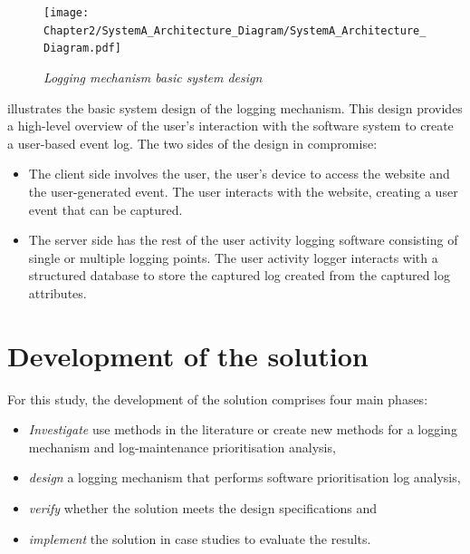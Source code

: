  \clearpage

 \begin{figure}[!htb]
	 \centering %
	 \texttt{[image: Chapter2/SystemA\_Architecture\_Diagram/SystemA\_Architecture\_Diagram.pdf]}
	 \caption[Logging mechanism basic system design]
	 {\textit{Logging mechanism basic system design}}\label{fig:ch2_systemDesign}
 \end{figure}
 
 illustrates the basic system design of the logging mechanism. This design provides a high-level overview of the user's interaction with the software system to create a user-based event log. The two sides of the design in  compromise:
 
 \begin{itemize}
	 \item The client side involves the user, the user's device to access the website and the user-generated event. The user interacts with the website, creating a user event that can be captured. 
	 \item The server side has the rest of the user activity logging software consisting of single or multiple logging points. The user activity logger interacts with a structured database to store the captured log created from the captured log attributes.
 \end{itemize}

 \clearpage

\section{Development of the solution}\label{sec:ch2_developementOfSolution}
For this study, the development of the solution comprises four main phases:

\begin{itemize}
	\item \textit{Investigate} use methods in the literature or create new methods for a logging mechanism and log-maintenance prioritisation analysis,
	\item \textit{design} a logging mechanism that performs software prioritisation log analysis,
	\item \textit{verify} whether the solution meets the design specifications and
	\item \textit{implement} the solution in case studies to evaluate the results.
\end{itemize}

